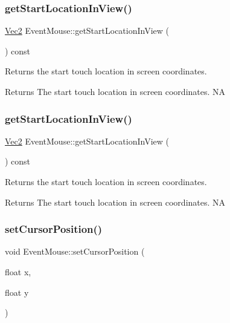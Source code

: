 \subsubsection{\texorpdfstring{get\+Start\+Location\+In\+View()}{getStartLocationInView()}\hspace{0.1cm}{\footnotesize\ttfamily [1/2]}}
{\footnotesize\ttfamily \hyperlink{classVec2}{Vec2} Event\+Mouse\+::get\+Start\+Location\+In\+View (\begin{DoxyParamCaption}{ }\end{DoxyParamCaption}) const}

Returns the start touch location in screen coordinates.

\begin{DoxyReturn}{Returns}
The start touch location in screen coordinates.  NA 
\end{DoxyReturn}
\mbox{\label{classEventMouse_a47cfa1bc5a0f367dd844d64c88ad697c}} 
\subsubsection{\texorpdfstring{get\+Start\+Location\+In\+View()}{getStartLocationInView()}\hspace{0.1cm}{\footnotesize\ttfamily [2/2]}}
{\footnotesize\ttfamily \hyperlink{classVec2}{Vec2} Event\+Mouse\+::get\+Start\+Location\+In\+View (\begin{DoxyParamCaption}{ }\end{DoxyParamCaption}) const}

Returns the start touch location in screen coordinates.

\begin{DoxyReturn}{Returns}
The start touch location in screen coordinates.  NA 
\end{DoxyReturn}
\mbox{\label{classEventMouse_ae379cb198545104ef7c79a6599213f99}} 
\subsubsection{\texorpdfstring{set\+Cursor\+Position()}{setCursorPosition()}\hspace{0.1cm}{\footnotesize\ttfamily [1/2]}}
{\footnotesize\ttfamily void Event\+Mouse\+::set\+Cursor\+Position (\begin{DoxyParamCaption}\item[{float}]{x,  }\item[{float}]{y }\end{DoxyParamCaption})\hspace{0.3cm}{\ttfamily [inline]}}

